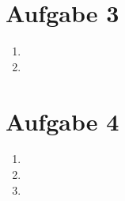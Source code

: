 \documentclass[11pt,a4paper,ngerman]{article}
\begin{document}
\section*{Aufgabe 3}
\begin{enumerate}[\bfseries a)]
\item

\item

\end{enumerate}

\section*{Aufgabe 4}
\begin{enumerate}[\bfseries a)]
\item

\item


\item

\end{enumerate}

\label{LastPage}
\end{document}
